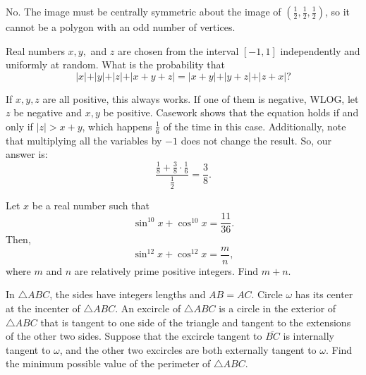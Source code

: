 \documentclass[11pt]{article}
\theoremstyle{definition}
\begin{document}
\begin{solution}[name={Solution by CantonMathGuy}]
	No. The image must be centrally symmetric about the image of $(\tfrac{1}{2}, \tfrac{1}{2}, \tfrac{1}{2})$, so it cannot be a polygon with an odd number of vertices.
\end{solution}



\begin{question}[name={2018 HMMT, November General, \href{https://artofproblemsolving.com/community/c129h1590292p9853489}{Problem 10}}]
	Real numbers $x,y,$ and $z$ are chosen from the interval $[-1,1]$ independently and uniformly at random. What is the probability that$$\vert{x}\vert+\vert{y}\vert+\vert{z}\vert+\vert{x+y+z}\vert=\vert{x+y}\vert+\vert{y+z}\vert+\vert{z+x}\vert?$$
\end{question}




\begin{solution}[name={Solution by iNomOnCountdown}]
	If $x, y, z$ are all positive, this always works. If one of them is negative, WLOG, let $z$ be negative and $x, y$ be positive. Casework shows that the equation holds if and only if $|z| > x+y$, which happens $\frac{1}{6}$ of the time in this case. Additionally, note that multiplying all the variables by $-1$ does not change the result. So, our answer is:
	$$\frac{\frac{1}{8} + \frac{3}{8} \cdot \frac{1}{6}}{\frac{1}{2}} = \boxed{\frac{3}{8}}.$$
\end{solution}





\begin{question}[name={2019 AIME I, \href{https://artofproblemsolving.com/community/c4p11972735}{Problem 8}}]
	Let $x$ be a real number such that $$\sin^{10}x+\cos^{10} x = \frac{11}{36}.$$ Then, $$\sin^{12}x+\cos^{12} x = \frac{m}{n},$$ where $m$ and $n$ are relatively prime positive integers. Find $m+n$.	
\end{question}


%	












\begin{question}[name={2019 AIME I, \href{https://artofproblemsolving.com/community/c4p11972878}{Problem 11}}]
	In $\triangle ABC$, the sides have integers lengths and $AB=AC$. Circle $\omega$ has its center at the incenter of $\triangle ABC$. An excircle of $\triangle ABC$ is a circle in the exterior of $\triangle ABC$ that is tangent to one side of the triangle and tangent to the extensions of the other two sides. Suppose that the excircle tangent to $\overline{BC}$ is internally tangent to $\omega$, and the other two excircles are both externally tangent to $\omega$. Find the minimum possible value of the perimeter of $\triangle ABC$.
\end{question}
\end{document}
